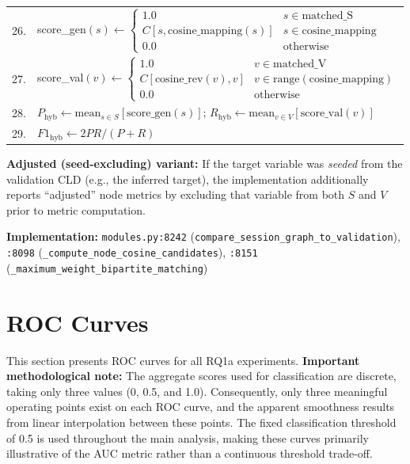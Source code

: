 \begin{table}[H]
\begin{tabular}{@{}r l@{}}
26. & score\_gen$(s) \leftarrow \begin{cases}1.0 & s \in \text{matched\_S}\\ C[s, \text{cosine\_mapping}(s)] & s \in \text{cosine\_mapping}\\ 0.0 & \text{otherwise}\end{cases}$ \\
27. & score\_val$(v) \leftarrow \begin{cases}1.0 & v \in \text{matched\_V}\\ C[\text{cosine\_rev}(v), v] & v \in \text{range}(\text{cosine\_mapping})\\ 0.0 & \text{otherwise}\end{cases}$ \\
28. & $P_{\mathrm{hyb}} \leftarrow \mathrm{mean}_{s\in S}[\mathrm{score\_gen}(s)]$; $R_{\mathrm{hyb}} \leftarrow \mathrm{mean}_{v\in V}[\mathrm{score\_val}(v)]$ \\
29. & $F1_{\mathrm{hyb}} \leftarrow 2PR/(P+R)$ \\
\bottomrule
\end{tabular}
\end{table}

\noindent\textbf{Adjusted (seed-excluding) variant:} If the target variable was \textit{seeded} from the validation CLD (e.g., the inferred target), the implementation additionally reports ``adjusted'' node metrics by excluding that variable from both $S$ and $V$ prior to metric computation.

\noindent\textbf{Implementation:} \texttt{modules.py:8242} (\texttt{compare\_session\_graph\_to\_validation}), \texttt{:8098} (\texttt{\_compute\_node\_cosine\_candidates}), \texttt{:8151} (\texttt{\_maximum\_weight\_bipartite\_matching})



\chapter{ROC Curves}
\label{sec:appendix_roc_curves}

This section presents ROC curves for all RQ1a experiments. \textbf{Important methodological note:} The aggregate scores used for classification are discrete, taking only three values (0, 0.5, and 1.0). Consequently, only three meaningful operating points exist on each ROC curve, and the apparent smoothness results from linear interpolation between these points. The fixed classification threshold of 0.5 is used throughout the main analysis, making these curves primarily illustrative of the AUC metric rather than a continuous threshold trade-off.

